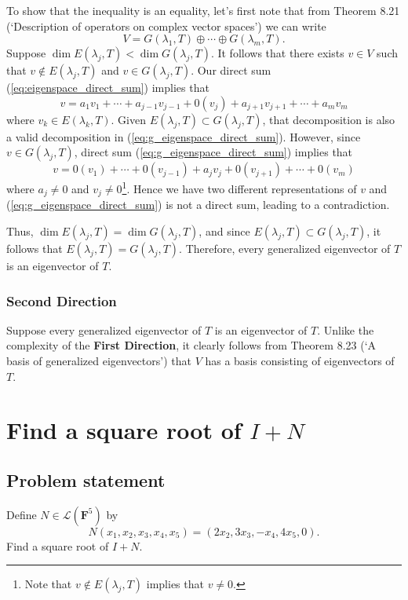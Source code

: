 \documentclass{article}
\begin{document}
To show that the inequality is an equality, let's first note that from Theorem 8.21 (`Description of operators on complex vector spaces') we can write
\begin{equation}\label{eq:g_eigenspace_direct_sum}
    V=G(\lambda_1,T)\oplus\cdots\oplus G(\lambda_m,T).
\end{equation}
Suppose $\operatorname{dim}E(\lambda_j,T)< \operatorname{dim}G(\lambda_j,T)$. 
It follows that there exists $v\in V$ such that $v\notin E(\lambda_j,T)$ and $v\in G(\lambda_j,T)$. 
Our direct sum (\ref{eq:eigenspace_direct_sum}) implies that 
\[v=a_1v_1+\cdots+a_{j-1}v_{j-1}+0(v_j)+a_{j+1}v_{j+1}+\cdots+a_mv_m\]
where $v_k\in E(\lambda_k,T)$. Given $E(\lambda_j,T)\subset G(\lambda_j,T)$, that decomposition is also a valid decomposition in (\ref{eq:g_eigenspace_direct_sum}).
However, since $v\in G(\lambda_j,T)$, direct sum (\ref{eq:g_eigenspace_direct_sum}) implies that
\[v=0(v_1)+\cdots+0(v_{j-1})+a_jv_j+0(v_{j+1})+\cdots+0(v_m)\]
where $a_j\neq 0$ and $v_j\neq 0$\footnote{
Note that $v\notin E(\lambda_j,T)$ implies that $v\neq 0$.
}. 
Hence we have two different representations of $v$ and (\ref{eq:g_eigenspace_direct_sum}) is not a direct sum, leading to a contradiction. 

Thus, $\operatorname{dim}E(\lambda_j,T)=\operatorname{dim}G(\lambda_j,T)$, and since $E(\lambda_j,T)\subset G(\lambda_j,T)$, it follows that $E(\lambda_j,T)=G(\lambda_j,T)$. 
Therefore, every generalized eigenvector of $T$ is an eigenvector of $T$.

\subsubsection*{Second Direction}
Suppose every generalized eigenvector of $T$ is an eigenvector of $T$. 
Unlike the complexity of the \textbf{First Direction}, it clearly follows from Theorem 8.23 (`A basis of generalized eigenvectors') that $V$ has a basis consisting of eigenvectors of $T$.

\clearpage

\section{Find a square root of $I+N$}
\subsection*{Problem statement}
Define $N\in\mathcal{L}(\mathbf{F}^5)$ by
\[N(x_1,x_2,x_3,x_4,x_5)=(2x_2,3x_3,-x_4,4x_5,0).\]
Find a square root of $I+N$.
\end{document}
